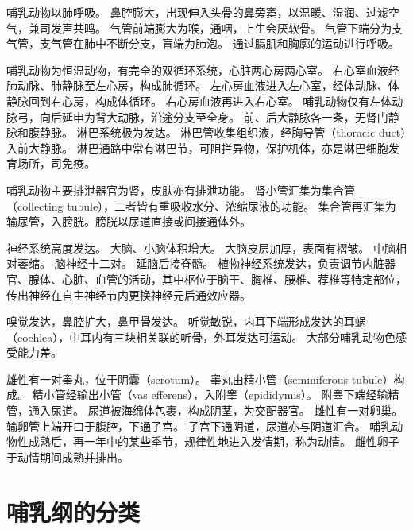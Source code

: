 \documentclass[11pt]{article}
\begin{document}
\newline

哺乳动物以肺呼吸。
鼻腔膨大，出现伸入头骨的鼻旁窦，以温暖、湿润、过滤空气，兼司发声共鸣。
气管前端膨大为喉，通咽，上生会厌软骨。
气管下端分为支气管，支气管在肺中不断分支，盲端为肺泡。
通过膈肌和胸廓的运动进行呼吸。

\newline

哺乳动物为恒温动物，有完全的双循环系统，心脏两心房两心室。
右心室血液经肺动脉、肺静脉至左心房，构成肺循环。
左心房血液进入左心室，经体动脉、体静脉回到右心房，构成体循环。
右心房血液再进入右心室。
哺乳动物仅有左体动脉弓，向后延申为背大动脉，沿途分支至全身。
前、后大静脉各一条，无肾门静脉和腹静脉。
淋巴系统极为发达。
淋巴管收集组织液，经胸导管（thoracic duct）入前大静脉。
淋巴通路中常有淋巴节，可阻拦异物，保护机体，亦是淋巴细胞发育场所，司免疫。

\newline

哺乳动物主要排泄器官为肾，皮肤亦有排泄功能。
肾小管汇集为集合管（collecting tubule），二者皆有重吸收水分、浓缩尿液的功能。
集合管再汇集为输尿管，入膀胱。膀胱以尿道直接或间接通体外。

\newline

神经系统高度发达。
大脑、小脑体积增大。
大脑皮层加厚，表面有褶皱。
中脑相对萎缩。
脑神经十二对。
延脑后接脊髓。
植物神经系统发达，负责调节内脏器官、腺体、心脏、血管的活动，其中枢位于脑干、胸椎、腰椎、荐椎等特定部位，传出神经在自主神经节内更换神经元后通效应器。

\newline

嗅觉发达，鼻腔扩大，鼻甲骨发达。
听觉敏锐，内耳下端形成发达的耳蜗（cochlea），中耳内有三块相关联的听骨，外耳发达可运动。
大部分哺乳动物色感受能力差。

\newline

雄性有一对睾丸，位于阴囊（scrotum）。
睾丸由精小管（seminiferous tubule）构成。
精小管经输出小管（vas efferens），入附睾（epididymis）。
附睾下端经输精管，通入尿道。
尿道被海绵体包裹，构成阴茎，为交配器官。
雌性有一对卵巢。输卵管上端开口于腹腔，下通子宫。
子宫下通阴道，尿道亦与阴道汇合。
哺乳动物性成熟后，再一年中的某些季节，规律性地进入发情期，称为动情。
雌性卵子于动情期间成熟并排出。

\section{哺乳纲的分类}
\end{document}
